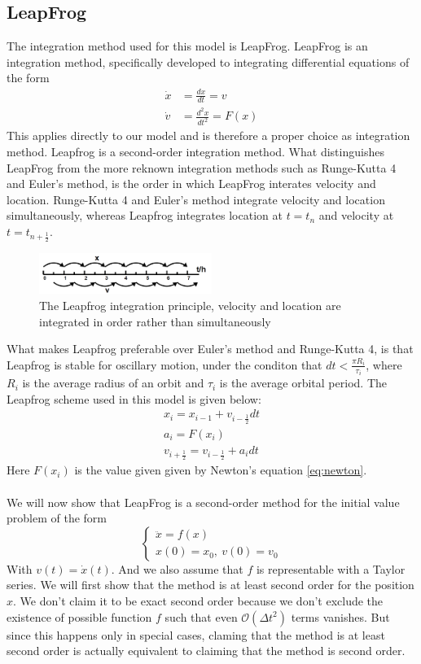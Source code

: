 \subsection{LeapFrog}
The integration method used for this model is LeapFrog. LeapFrog is an integration method, specifically developed to integrating differential equations of the form 
\begin{align*}
	\dot{x}&=\frac{dx}{dt}=v\\
	\dot{v}&=\frac{d^2x}{dt^2}=F(x)
\end{align*}
This applies directly to our model and is therefore a proper choice as integration method. Leapfrog is a second-order integration method. 
What distinguishes LeapFrog from the more reknown integration methods such as Runge-Kutta 4 and Euler's method, is the order in which LeapFrog interates velocity and location. 
Runge-Kutta 4 and Euler's method integrate velocity and location simultaneously, whereas Leapfrog integrates location at \(t=t_n\) and velocity at \(t=t_{n+\frac{1}{2}}\). 
\begin{figure}[H]
  \centering
  \includegraphics[width=0.5\textwidth]{Leapfrog}
  \caption{The Leapfrog integration principle, velocity and location are integrated in order rather than simultaneously}
  \label{fig:leapfrog}
\end{figure}
What makes Leapfrog preferable over Euler's method and Runge-Kutta 4, is that Leapfrog is stable for oscillary motion, under the conditon that \(dt<\frac{\pi R_i}{\tau_i}\), where \(R_i\) is the average radius of an orbit and \(\tau_i\) is the average orbital period\cite{StabLeapfrog}. 
The Leapfrog scheme used in this model is given below:
\begin{align*}
x_i = x_{i-1}+v_{i-\frac{1}{2}} dt\\
a_i= F(x_i)\\
v_{i+\frac{1}{2}}=v_{i-\frac{1}{2}}+ a_idt
\end{align*}
Here \(F(x_i)\) is the value given given by Newton's equation \eqref{eq:newton}.\\
\\
We will now show that LeapFrog is a second-order method for the initial value problem of the form
\[\begin{cases}
	\ddot{x}=f(x)\\
	x(0)=x_0,~v(0)=v_0
\end{cases}\]
With $v(t)=\dot{x}(t)$. And we also assume that $f$ is representable with a Taylor series. 
We will first show that the method is at least second order for the position $x$. We don't claim it to be exact second order because we don't exclude the existence of possible function $f$ such that even $\mathcal{O}(\Delta t^2)$ terms vanishes. But since this happens only in special cases, claming that the method is at least second order is actually equivalent to claiming that the method is second order.\\

